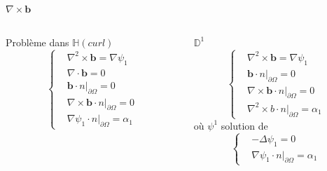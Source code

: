 \documentclass{beamer}
\newcommand{\HH}{{\mathbb{H}}}
\newcommand{\DD}{{\mathbb{D}}}
\newcommand{\grad}{{\nabla}}
\newcommand{\laplace}{{\Delta}}
\newcommand{\rot}{{\nabla\times}}
\newcommand{\rott}{{\nabla^2\times}}
\newcommand{\diverg}{{\nabla\cdot}}
\newcommand{\restr}{{\big\rvert_{\partial\Omega}}}
\begin{document}
\begin{frame}{$\rot \mathbf{b}$}
\begin{columns}[t]
\begin{column}{5cm}
\begin{block}{Problème dans $\HH(curl)$}
\[\left\{
\begin{aligned}
&\rott \mathbf{b} = \grad\psi_1\\
&\diverg \mathbf{b} = 0\\
&\mathbf{b}\cdot n\restr = 0\\
&\rot \mathbf{b}\cdot n\restr = 0\\
&\grad\psi_1\cdot n\restr = \alpha_1
\end{aligned}
\right.\]
\end{block}
\end{column}
\begin{column}{5cm}
\begin{block}{$\DD^1$}
\[\left\{
\begin{aligned}
&\rott \mathbf{b} = \grad\psi_1\\
&\mathbf{b}\cdot n\restr = 0\\
&\rot \mathbf{b}\cdot n\restr = 0\\
&\rott b\cdot n\restr = \alpha_1
\end{aligned}
\right.\]
où $\psi^1$ solution de
\[\left\{
\begin{aligned}
&-\laplace\psi_1 = 0\\
&\grad\psi_1\cdot n\restr=\alpha_1
\end{aligned}
\right.\]
\end{block}
\end{column}
\end{columns}
\end{frame}
\end{document}
